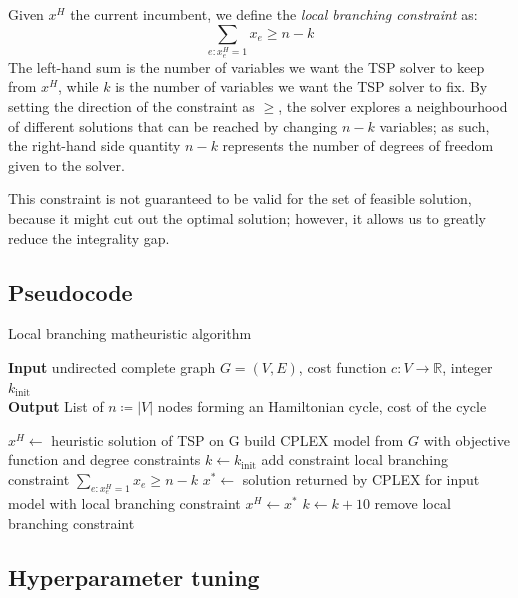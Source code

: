 Given $x^H$ the current incumbent, we define the \textit{local branching constraint} as:
$$\sum_{e:x^H_e=1}x_e\geq n-k$$
The left-hand sum is the number of variables we want the TSP solver to keep from $x^H$, while $k$ is the number of variables we want the TSP solver to fix. By setting the direction of the constraint as $\geq$, the solver explores a neighbourhood of different solutions that can be reached by changing $n-k$ variables; as such, the right-hand side quantity $n-k$ represents the number of degrees of freedom given to the solver.

This constraint is not guaranteed to be valid for the set of feasible solution, because it might cut out the optimal solution; however, it allows us to greatly reduce the integrality gap.

\FloatBarrier
\subsection{Pseudocode}
\begin{algorithm}[h]
    \caption{Local branching matheuristic algorithm}
    \hspace*{\algorithmicindent} \textbf{Input} undirected complete graph $G=(V,E)$, cost function $c:V\rightarrow\mathbb{R}$, integer $k_{\text{init}}$\\
    \hspace*{\algorithmicindent} \textbf{Output} List of $n\coloneq|V|$ nodes forming an Hamiltonian cycle, cost of the cycle
    \begin{algorithmic}

        \State $x^H \leftarrow$ heuristic solution of TSP on G
        \State build CPLEX model from $G$ with objective function and degree constraints
        \State $k\leftarrow k_{\text{init}}$
        \State add constraint local branching constraint $\sum_{e:x_e^H=1}x_e\geq n-k$
        \State $x^*\leftarrow$ solution returned by CPLEX for input model with local branching constraint
        \State $x^H\leftarrow x^*$
        \EndIf
        \State $k\leftarrow k+10$
        \EndIf
        \State remove local branching constraint
        \EndWhile

    \end{algorithmic}
\end{algorithm}
\FloatBarrier

\subsection{Hyperparameter tuning}

